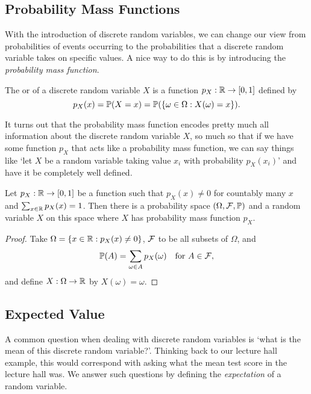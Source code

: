 \documentclass[a4paper]{scrartcl}
\begin{document}

\subsection{Probability Mass Functions}

With the introduction of discrete random variables, we can change our view from probabilities of events occurring to the probabilities that a discrete random variable takes on specific values. A nice way to do this is by introducing the \emph{probability mass function}.

\begin{definition}
	The  or  of a discrete random variable $X$ is a function $p_X: \mathbb{R} \rightarrow [0, 1]$ defined by
	$$
	p_X(x) = \mathbb{P}(X = x) = \mathbb{P}(\{ \omega \in \Omega : X(\omega) = x\}).
	$$
\end{definition}

It turns out that the probability mass function encodes pretty much all information about the discrete random variable $X$, so much so that if we have some function $p_X$ that acts like a probability mass function, we can say things like `let $X$ be a random variable taking value $x_i$ with probability $p_X(x_i)$' and have it be completely well defined.

\begin{theorem}
	Let $p_X : \mathbb{R} \rightarrow [0, 1]$ be a function such that $p_X(x) \neq 0$ for countably many $x$ and $\sum_{x \in \mathbb{R}} p_X(x) = 1$. Then there is a probability space $(\Omega, \mathcal{F}, \mathbb{P})$ and a random variable $X$ on this space where $X$ has probability mass function $p_X$.
\end{theorem}
\begin{proof}
	Take $\Omega = \{x \in \mathbb{R} : p_X(x) \neq 0\}$, $\mathcal{F}$ to be all subsets of $\Omega$, and 
	$$
	\mathbb{P}(A) = \sum_{\omega \in A} p_X(\omega) \quad \text{for }A \in \mathcal{F},
	$$
	and define $X : \Omega \rightarrow \mathbb{R}$ by $X(\omega) = \omega$.
\end{proof}


\subsection{Expected Value}

A common question when dealing with discrete random variables is `what is the mean of this discrete random variable?'. Thinking back to our 
lecture hall example, this would correspond with asking what the mean test score in the lecture hall was.
We answer such questions by defining the \emph{expectation} of a random variable.
\end{document}
